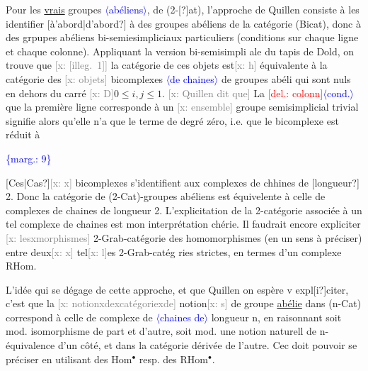 \documentclass[11pt]{article}
\newcommand{\scanpage}[1]{\par\bigskip\noindent{\small\sffamily[scan #1]}\par}
\newcommand{\mspage}[1]{{\small\sffamily[p.\,#1]}}
\newcommand{\hand}[1]{\textcolor{blue}{#1}}
\let\over\relax
\newcommand{\over}[2]{\textcolor{gray}{#1}\textcolor{blue}{\ensuremath{^{\!\nearrow}}#2}}
\newcommand{\inserted}[2][]{\textcolor{blue}{$\langle$#2$\rangle$}}
\newcommand{\margin}[1]{\textcolor{blue}{\{\textsf{marg.:} #1\}}}
\newcommand{\deleted}[1]{\textcolor{red}{[\textsf{del.:} #1]}}
\newcommand{\xout}[1]{\textcolor{gray}{[\textsf{x:} #1]}}
\newcommand{\uline}[1]{\underline{#1}}
\newcommand{\unsure}[1]{[#1?]}
\newcommand{\illegible}[1]{[\textsf{illeg.\ #1}]}
\newenvironment{diagramblock}{\par\begin{center}}{\end{center}\par}
\begin{document}
Pour les \uline{vrais} groupes \inserted{abéliens}, de (2-\unsure{\over{C}{C}}at), l'approche de Quillen consiste à
les identifier \unsure{à'abord|d'abord} à des groupes abéliens de la catégorie (Bicat),
donc à des grpupes abéliens bi-semiesimpliciaux particuliers (conditions
sur chaque ligne et chaque colonne). Appliquant la version bi-semisimpli
ale du tapis de Dold, on trouve que \xout{\illegible{1}} la catégorie de ces objets
est\xout{h} équivalente à la catégorie des \xout{objets} bicomplexes \inserted{de chaines} de groupes  abéli
qui sont nuls en dehors du carré  \xout{D}$0 \leq i,j \leq 1$.  \xout{Quillen dit que} La \deleted{colonn}\inserted{cond.}
que la première ligne corresponde à un \xout{ensemble} groupe semisimplicial
trivial signifie alors qu'elle n'a que le terme de degré zéro, i.e. que
le bicomplexe est réduit à

\begin{diagramblock}
\end{diagramblock}

\margin{\hand{9}}

\clearpage
\scanpage{162-5/10}
\mspage{9}

\unsure{Ces|Cas}\xout{x} bicomplexes s'identifient aux complexes de chhines  de \unsure{longueur} 2.
Donc la catégorie de (2-Cat)-groupes abéliens est équivelente à celle de
complexes de chaines de longueur 2. L'explicitation de la 2-catégorie
associée à un tel complexe de chaines est mon interprétation chérie. Il
faudrait encore expliciter \xout{lesxmorphismes}  2-Grab-catégorie  des
homomorphismes (en un sens à préciser) entre deux\xout{x} tel\xout{l}es  2-Grab-catég
ries strictes, en termes d'un complexe RHom.

L'idée qui se dégage de cette approche, et que Quillen on espère v
expl\unsure{i}citer, c'est que la \xout{notionxdexcatégoriexde} notion\xout{s} de groupe \uline{abélie}
dans (n-Cat) correspond à celle de complexe de \inserted{chaines de} longueur n, en raisonnant
soit mod. isomorphisme de part et d'autre, soit mod. une notion naturell
de n-équivalence d'un côté, et dans la catégorie dérivée de l'autre. Cec
doit pouvoir se préciser en utilisant des Hom$^{\bullet}$ resp. des RHom$^{\bullet}$.
\end{document}
